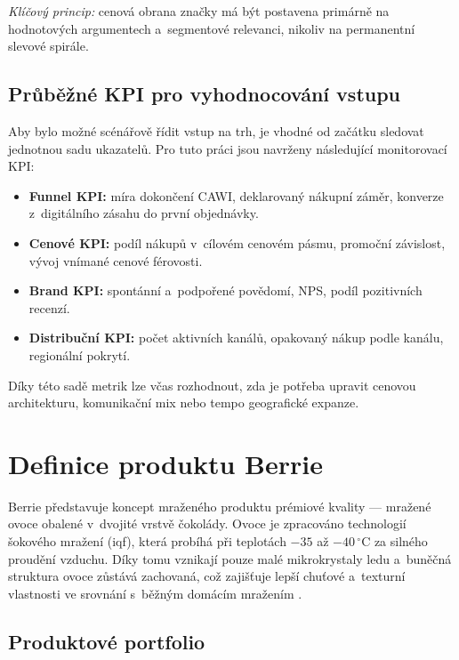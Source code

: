 \textit{Klíčový princip:} cenová obrana značky má být postavena primárně na hodnotových argumentech a~segmentové relevanci, nikoliv na permanentní slevové spirále.

\subsection{Průběžné KPI pro vyhodnocování vstupu}
\label{subsec:res_entry_kpi}

Aby bylo možné scénářově řídit vstup na trh, je vhodné od začátku sledovat jednotnou sadu ukazatelů. Pro tuto práci jsou navrženy následující monitorovací KPI:
\begin{itemize}
  \item \textbf{Funnel KPI:} míra dokončení CAWI, deklarovaný nákupní záměr, konverze z~digitálního zásahu do první objednávky.
  \item \textbf{Cenové KPI:} podíl nákupů v~cílovém cenovém pásmu, promoční závislost, vývoj vnímané cenové férovosti.
  \item \textbf{Brand KPI:} spontánní a~podpořené povědomí, NPS, podíl pozitivních recenzí.
  \item \textbf{Distribuční KPI:} počet aktivních kanálů, opakovaný nákup podle kanálu, regionální pokrytí.
\end{itemize}

Díky této sadě metrik lze včas rozhodnout, zda je potřeba upravit cenovou architekturu, komunikační mix nebo tempo geografické expanze.

\section{Definice produktu Berrie}
\label{sec:res_product}


Berrie představuje koncept mraženého produktu prémiové kvality — mražené ovoce obalené v~dvojité vrstvě čokolády. Ovoce je zpracováno technologií šokového mražení (\gls{iqf}), která probíhá při teplotách $-35$ až $-40\,^{\circ}\mathrm{C}$ za silného proudění vzduchu. Díky tomu vznikají pouze malé mikrokrystaly ledu a~buněčná struktura ovoce zůstává zachovaná, což zajišťuje lepší chuťové a~texturní vlastnosti ve srovnání s~běžným domácím mražením \parencite{grover_negi_2023, oldenburg_2025}.

\subsection{Produktové portfolio}

